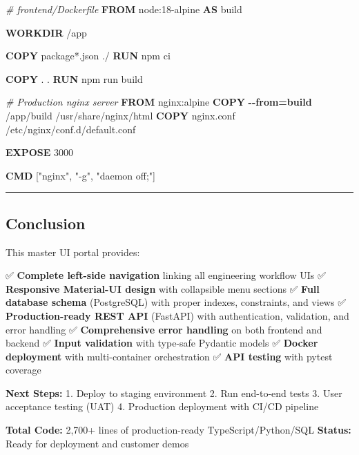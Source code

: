 \documentclass[
]{article}
\newenvironment{Shaded}{\begin{snugshade}}{\end{snugshade}}
\newcommand{\CommentTok}[1]{\textcolor[rgb]{0.56,0.35,0.01}{\textit{#1}}}
\newcommand{\ExtensionTok}[1]{#1}
\newcommand{\KeywordTok}[1]{\textcolor[rgb]{0.13,0.29,0.53}{\textbf{#1}}}
\newcommand{\NormalTok}[1]{#1}
\newcommand{\OperatorTok}[1]{\textcolor[rgb]{0.81,0.36,0.00}{\textbf{#1}}}
\newcommand{\StringTok}[1]{\textcolor[rgb]{0.31,0.60,0.02}{#1}}
\begin{document}
\begin{Shaded}
\begin{Highlighting}[]
\CommentTok{\# frontend/Dockerfile}
\KeywordTok{FROM}\NormalTok{ node:18{-}alpine }\KeywordTok{AS}\NormalTok{ build}

\KeywordTok{WORKDIR}\NormalTok{ /app}

\KeywordTok{COPY}\NormalTok{ package*.json ./}
\KeywordTok{RUN} \ExtensionTok{npm}\NormalTok{ ci}

\KeywordTok{COPY}\NormalTok{ . .}
\KeywordTok{RUN} \ExtensionTok{npm}\NormalTok{ run build}

\CommentTok{\# Production nginx server}
\KeywordTok{FROM}\NormalTok{ nginx:alpine}
\KeywordTok{COPY} \OperatorTok{{-}{-}from=build}\NormalTok{ /app/build /usr/share/nginx/html}
\KeywordTok{COPY}\NormalTok{ nginx.conf /etc/nginx/conf.d/default.conf}

\KeywordTok{EXPOSE}\NormalTok{ 3000}

\KeywordTok{CMD}\NormalTok{ [}\StringTok{"nginx"}\NormalTok{, }\StringTok{"{-}g"}\NormalTok{, }\StringTok{"daemon off;"}\NormalTok{]}
\end{Highlighting}
\end{Shaded}

\begin{center}\rule{0.5\linewidth}{0.5pt}\end{center}

\hypertarget{conclusion}{%
\subsection{Conclusion}\label{conclusion}}

This master UI portal provides:

✅ \textbf{Complete left-side navigation} linking all engineering
workflow UIs ✅ \textbf{Responsive Material-UI design} with collapsible
menu sections ✅ \textbf{Full database schema} (PostgreSQL) with proper
indexes, constraints, and views ✅ \textbf{Production-ready REST API}
(FastAPI) with authentication, validation, and error handling ✅
\textbf{Comprehensive error handling} on both frontend and backend ✅
\textbf{Input validation} with type-safe Pydantic models ✅
\textbf{Docker deployment} with multi-container orchestration ✅
\textbf{API testing} with pytest coverage

\textbf{Next Steps:} 1. Deploy to staging environment 2. Run end-to-end
tests 3. User acceptance testing (UAT) 4. Production deployment with
CI/CD pipeline

\textbf{Total Code:} 2,700+ lines of production-ready
TypeScript/Python/SQL \textbf{Status:} Ready for deployment and customer
demos
\end{document}
